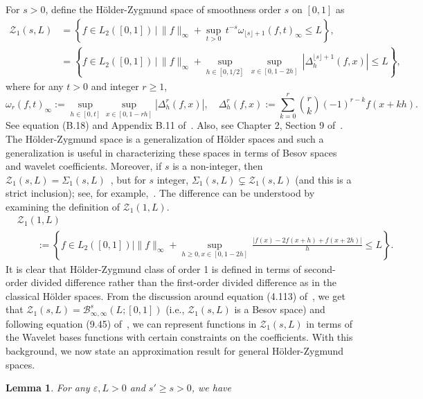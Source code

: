 \documentclass[12pt]{article}
\newtheorem{lemma}[theorem]{Lemma}
\begin{document}
\begin{appendices}
For $ s > 0$, define the H{\"o}lder-Zygmund space of smoothness order $ s$ on $[0, 1]$ as
\begin{align*}
\mathcal{Z}_{1}( s, L) &= \left\{f\in L_2([0, 1])\,\bigg| \,\|f\|_{\infty} + \sup_{t > 0}\,t^{- s}\omega_{\lfloor s\rfloor+1}(f, t)_{\infty} \le L\right\},\\
&= \left\{f\in L_2([0, 1])\,\bigg| \,\|f\|_{\infty} + \sup_{h\in[0, 1/2]}\, \sup_{x\in[0, 1-2h]}\,|\Delta_h^{\lfloor s\rfloor + 1}(f, x)| \le L\right\},
\end{align*}
where for any $t > 0$ and integer $r \ge 1$,
\[
\omega_r(f, t)_{\infty} := \sup_{h\in[0, t]}\sup_{x\in[0, 1-rh]}\left|\Delta_h^r(f, x)\right|,\quad\Delta_h^r(f, x) := \sum_{k=0}^r \binom{r}{k}(-1)^{r-k}f(x + kh).
\]
See equation (B.18) and Appendix B.11 of~\cite{johnstone2017gaussian}. Also, see Chapter 2, Section 9 of~\cite{devore1993constructive}. The H{\"o}lder-Zygmund space is a generalization of H{\"o}lder spaces and such a generalization is useful in characterizing these spaces in terms of Besov spaces and wavelet coefficients. Moreover, if $ s$ is a non-integer, then $\mathcal{Z}_1( s, L) = \Sigma_1( s, L)$~\citep[Proposition 4.3.23]{gine2021mathematical}, but for $ s$ integer, $\Sigma_1( s, L)\subsetneq \mathcal{Z}_1( s, L)$ (and this is a strict inclusion); see, for example,~\cite[page 92]{devore1993constructive}. The difference can be understood by examining the definition of $\mathcal{Z}_1(1, L)$.
\begin{align*}
    &\mathcal{Z}_1(1, L) \\
    &\qquad := \left\{f\in L_2([0, 1])\big|\|f\|_{\infty} + \sup_{h\ge 0, x\in[0, 1-2h]}\,\frac{|f(x) - 2f(x + h) + f(x + 2h)|}{h} \le L\right\}.
\end{align*}
It is clear that H{\"o}lder-Zygmund class of order 1 is defined in terms of second-order divided difference rather than the first-order divided difference as in the classical H{\"o}lder spaces. 
From the discussion around equation (4.113) of~\cite{gine2021mathematical}, we get that $\mathcal{Z}_1( s, L) = \mathcal{B}_{\infty, \infty}^{ s}(L; [0, 1])$ 
(i.e., $\mathcal{Z}_1( s, L)$ is a Besov space) and following equation (9.45) of~\cite{johnstone2017gaussian}, we can represent functions in $\mathcal{Z}_1( s, L)$ in terms of the Wavelet bases functions with certain constraints on the coefficients. With this background, we now state an approximation result for general H{\"o}lder-Zygmund spaces.
\begin{lemma}\label{prop:Holder-Zygmund}
For any $\varepsilon, L > 0$ and $ s' \ge  s > 0$, we have

\end{lemma}
\end{appendices}
\end{document}
